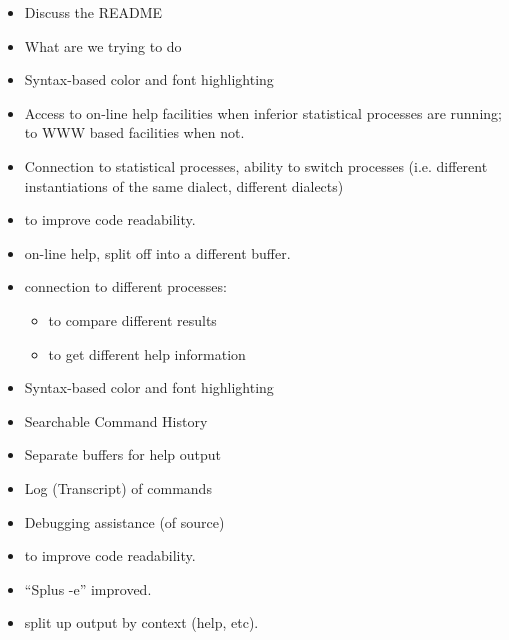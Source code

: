 \documentclass[semhelv]{seminar}
\begin{document}
\begin{itemize}
\item Discuss the README
\item What are we trying to do
\end{itemize}

\begin{slide}

  \begin{itemize}
  \item Syntax-based color and font highlighting
  \item Access to on-line help facilities when inferior statistical
    processes are running; to WWW based facilities when not.
  \item Connection to statistical processes, ability to switch
    processes (i.e. different instantiations of the same dialect,
    different dialects)
  \end{itemize}
\end{slide}

\begin{itemize}
\item to improve code readability.
\item on-line help, split off into a different buffer.
\item connection to different processes:
  \begin{itemize}
  \item to compare different results
  \item to get different help information
  \end{itemize}
\end{itemize}


\begin{slide}

  \begin{itemize}
  \item Syntax-based color and font highlighting
  \item Searchable Command History
  \item Separate buffers for help output
  \item Log (Transcript) of commands
  \item Debugging assistance (of source)
  \end{itemize}
\end{slide}

\begin{itemize}
\item to improve code readability.
\item ``Splus -e'' improved.
\item split up output by context (help, etc).
\end{itemize}
\end{document}
